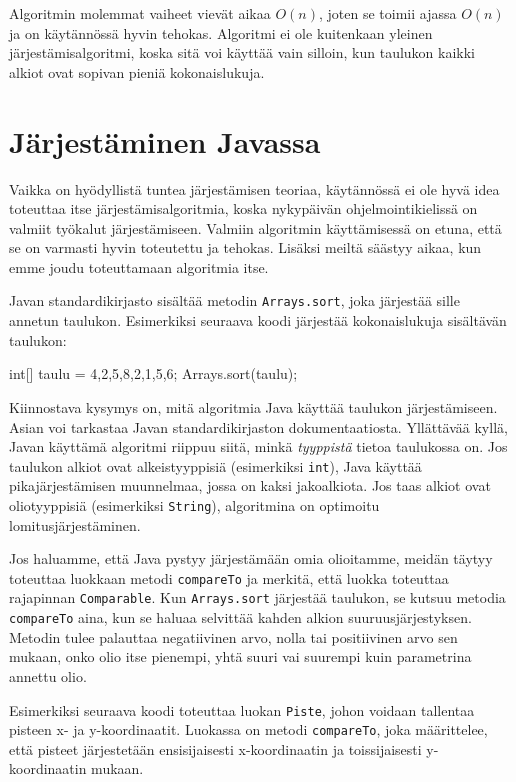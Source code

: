 Algoritmin molemmat vaiheet vievät aikaa $O(n)$,
joten se toimii ajassa $O(n)$ ja on käytännössä hyvin tehokas.
Algoritmi ei ole kuitenkaan yleinen järjestämisalgoritmi,
koska sitä voi käyttää vain silloin,
kun taulukon kaikki alkiot ovat sopivan pieniä kokonaislukuja.


\section{Järjestäminen Javassa}

Vaikka on hyödyllistä tuntea järjestämisen teoriaa,
käytännössä ei ole hyvä idea toteuttaa itse
järjestämisalgoritmia, koska nykypäivän ohjelmointikielissä
on valmiit työkalut järjestämiseen.
Valmiin algoritmin käyttämisessä on etuna,
että se on varmasti hyvin toteutettu ja tehokas.
Lisäksi meiltä säästyy aikaa, kun emme joudu
toteuttamaan algoritmia itse.

Javan standardikirjasto sisältää metodin \texttt{Arrays.sort},
joka järjestää sille annetun taulukon.
Esimerkiksi seuraava koodi järjestää kokonaislukuja
sisältävän taulukon:

\begin{code}
int[] taulu = {4,2,5,8,2,1,5,6};
Arrays.sort(taulu);
\end{code}

Kiinnostava kysymys on, mitä algoritmia Java käyttää
taulukon järjes\-tämiseen.
Asian voi tarkastaa Javan standardikirjaston
dokumentaatiosta.
Yllättävää kyllä, Javan käyttämä algoritmi riippuu siitä,
minkä \emph{tyyppistä} tietoa taulukossa on.
Jos taulukon alkiot ovat alkeistyyppisiä
(esimerkiksi \texttt{int}), Java käyttää 
pikajärjestämisen muunnelmaa,
jossa on kaksi jakoalkiota.
Jos taas alkiot ovat oliotyyppisiä
(esimerkiksi \texttt{String}),
algoritmina on optimoitu lomitusjärjestäminen.

Jos haluamme, että Java pystyy järjestämään omia olioitamme,
meidän täytyy toteuttaa luokkaan metodi \texttt{compareTo} ja
merkitä, että luokka toteuttaa rajapinnan \texttt{Comparable}.
Kun \texttt{Arrays.sort} järjestää taulukon,
se kutsuu metodia \texttt{compareTo} aina, kun se haluaa selvittää
kahden alkion suuruusjärjestyksen.
Metodin tulee palauttaa negatiivinen arvo, nolla tai positiivinen arvo
sen mukaan, onko olio itse pienempi, yhtä suuri vai suurempi
kuin parametrina annettu olio.

Esimerkiksi seuraava koodi toteuttaa luokan \texttt{Piste},
johon voidaan tallentaa pisteen x- ja y-koordinaatit.
Luokassa on metodi \texttt{compareTo}, joka määrittelee,
että pisteet järjestetään ensisijaisesti x-koordinaatin ja
toissijaisesti y-koordinaatin mukaan.

